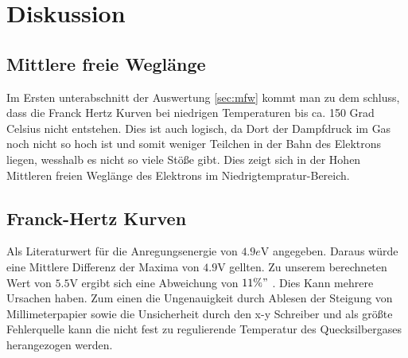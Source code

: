 \section{Diskussion}
\label{sec:Diskussion}
\subsection{Mittlere freie Weglänge}
Im Ersten unterabschnitt der Auswertung \autoref{sec:mfw} kommt man zu dem schluss, dass die Franck Hertz Kurven bei 
niedrigen Temperaturen bis ca. 150 Grad Celsius nicht entstehen. Dies ist auch logisch, da Dort der Dampfdruck im Gas 
noch nicht so hoch ist und somit weniger Teilchen in der Bahn des Elektrons liegen, wesshalb 
es nicht so viele Stöße gibt. Dies zeigt sich in der Hohen Mittleren freien Weglänge des Elektrons im Niedrigtempratur-Bereich.

\subsection{Franck-Hertz Kurven}
Als Literaturwert für die Anregungsenergie von $4.9 \unit{e\volt}$ angegeben. Daraus würde eine Mittlere Differenz der Maxima
 von $4.9 \unit{\volt}$ gellten. Zu unserem berechneten Wert von $5.5 \unit{\volt}$ ergibt sich eine Abweichung von $11 \%"$ . Dies Kann mehrere Ursachen haben.
 Zum einen die Ungenauigkeit durch Ablesen der Steigung von Millimeterpapier sowie die Unsicherheit durch den x-y Schreiber und als größte 
 Fehlerquelle kann die nicht fest zu regulierende Temperatur des Quecksilbergases herangezogen werden.
